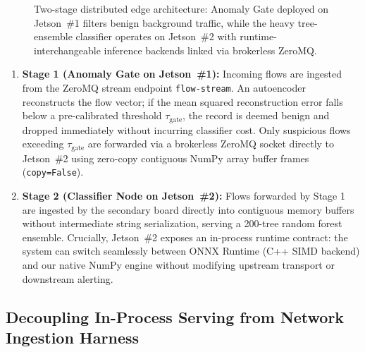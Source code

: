 \begin{figure}[t]
{}
  \caption{Two-stage distributed edge architecture: Anomaly Gate deployed on Jetson~\#1 filters benign background traffic, while the heavy tree-ensemble classifier operates on Jetson~\#2 with runtime-interchangeable inference backends linked via brokerless ZeroMQ.}
  \label{fig:architecture}
\end{figure}

\begin{enumerate}
    \item \textbf{Stage 1 (Anomaly Gate on Jetson~\#1):} Incoming flows are ingested from the ZeroMQ stream endpoint \texttt{flow-\allowbreak stream}. An autoencoder reconstructs the flow vector; if the mean squared reconstruction error falls below a pre-calibrated threshold $\tau_{\text{gate}}$, the record is deemed benign and dropped immediately without incurring classifier cost. Only suspicious flows exceeding $\tau_{\text{gate}}$ are forwarded via a brokerless ZeroMQ socket directly to Jetson~\#2 using zero-copy contiguous NumPy array buffer frames (\texttt{copy=False}).
    \item \textbf{Stage 2 (Classifier Node on Jetson~\#2):} Flows forwarded by Stage 1 are ingested by the secondary board directly into contiguous memory buffers without intermediate string serialization, serving a 200-tree random forest ensemble. Crucially, Jetson~\#2 exposes an in-process runtime contract: the system can switch seamlessly between ONNX Runtime (C++ SIMD backend) and our native NumPy engine without modifying upstream transport or downstream alerting.
\end{enumerate}

\subsection{Decoupling In-Process Serving from Network Ingestion Harness}

